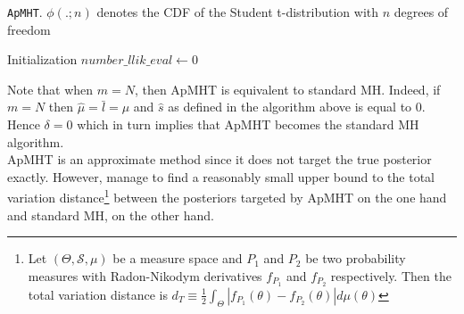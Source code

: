 \documentclass[11pt,a4paper]{report}\usepackage[]{graphicx}\usepackage[]{color}
\begin{document}
\begin{algorithm}[H]
 \caption{\texttt{ApMHT}. $\phi(.;n)$ denotes the CDF of the Student t-distribution with $n$  degrees of freedom}
 \label{algo:korattikara}
 Initialization\;
 $number\_llik\_eval\leftarrow 0$\;
\end{algorithm}

Note that when $m=N$, then ApMHT is equivalent to standard MH. Indeed, if $m=N$ then $\hat\mu=\bar l=\mu$ and $\hat s$ as defined in the algorithm above is equal to $0$. Hence $\delta=0$ which in turn implies that ApMHT becomes the standard MH algorithm. \\
ApMHT  is an approximate method since it does not target the true posterior exactly. However, \cite{korattikara2014austerity} manage to find a reasonably small upper bound to the total variation distance\footnote{Let $(\Theta, \mathcal S,\mu)$ be a measure space and $P_1$ and $P_2$ be two probability measures with Radon-Nikodym derivatives $f_{P_1}$ and $f_{P_2}$ respectively. Then the total variation distance is $d_T\equiv\frac 12 \int_{\Theta}|f_{P_1}(\theta)-f_{P_2}(\theta)|d\mu(\theta)$ } between the posteriors targeted by ApMHT on the one hand and standard MH, on the other hand.\\
\end{document}
